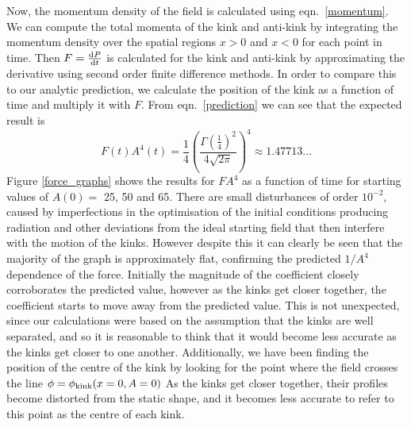 \documentclass[11pt, oneside]{article}  	%
\numberwithin{equation}{section}
\newcommand{\drv}{\ensuremath{\textup{d}}}
\begin{document}
Now, the momentum density of the field is calculated using eqn.~\ref{momentum}. We can compute the total momenta of the kink and anti-kink by integrating the momentum density over the spatial regions $x>0$ and $x<0$ for each point in time. Then $F = \frac{\drv P}{\drv t}$ is calculated for the kink and anti-kink by approximating the derivative using second order finite difference methods. In order to compare this to our analytic prediction, we calculate the position of the kink as a function of time and multiply it with $F$. From eqn.~\ref{prediction} we can see that the expected result is
\begin{equation}
F(t) A^4(t) =\frac{1}{4} \left (\frac{ \Gamma\left(\frac{1}{4}\right)^2}{4\sqrt{2\pi} }\right )^4 \approx 1.47713...
\end{equation}
Figure \ref{force_graphs} shows the results for $FA^4$ as a function of time for starting values of $A(0) = $ 25, 50 and 65. There are small disturbances of order $10^{-2}$, caused by imperfections in the optimisation of the initial conditions producing radiation and other deviations from the ideal starting field that then interfere with the motion of the kinks. However despite this it can clearly be seen that the majority of the graph is approximately flat, confirming the predicted $1/A^4$ dependence of the force. Initially the magnitude of the coefficient closely corroborates the predicted value, however as the kinks get closer together, the coefficient starts to move away from the predicted value. This is not unexpected, since our calculations were based on the assumption that the kinks are well separated, and so it is reasonable to think that it would become less accurate as the kinks get closer to one another. Additionally, we have been finding the position of the centre of the kink by looking for the point where the field crosses the line $\phi = \phi_{\textup{kink}}(x=0,A=0)$ As the kinks get closer together, their profiles become distorted from the static shape, and it becomes less accurate to refer to this point as the centre of each kink.
\end{document}
